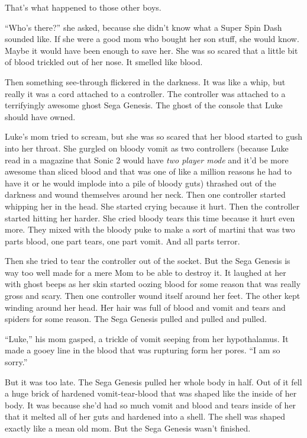 That's what happened to those other boys.



``Who's there?'' she asked, because she
didn't know what a Super Spin Dash sounded like. If she were
a good mom who bought her son stuff, she would know. Maybe it would
have been enough to save her. She was so scared that a little bit
of blood trickled out of her nose. It smelled like blood.



Then something see-through flickered in the darkness. It was like a
whip, but really it was a cord attached to a controller. The
controller was attached to a terrifyingly awesome ghost Sega
Genesis. The ghost of the console that Luke should have
owned.



Luke's mom tried to scream, but she was so scared that her
blood started to gush into her throat. She gurgled on bloody vomit
as two controllers (because Luke read in a magazine that Sonic 2
would have {\em two player mode} and it'd be more awesome
than sliced blood and that was one of like a million reasons he had
to have it or he would implode into a pile of bloody guts) thrashed
out of the darkness and wound themselves around her neck. Then one
controller started whipping her in the head. She started crying
because it hurt. Then the controller started hitting her harder.
She cried bloody tears this time because it hurt even more. They
mixed with the bloody puke to make a sort of martini that was two
parts blood, one part tears, one part vomit. And all parts
terror.



Then she tried to tear the controller out of the socket. But the
Sega Genesis is way too well made for a mere Mom to be able to
destroy it. It laughed at her with ghost beeps as her skin started
oozing blood for some reason that was really gross and scary. Then
one controller wound itself around her feet. The other kept winding
around her head. Her hair was full of blood and vomit and tears and
spiders for some reason. The Sega Genesis pulled and pulled and
pulled.



``Luke,'' his mom gasped, a trickle of vomit seeping from
her hypothalamus. It made a gooey line in the blood that was
rupturing form her pores. ``I am so sorry.''



But it was too late. The Sega Genesis pulled her whole body in
half. Out of it fell a huge brick of hardened vomit-tear-blood that
was shaped like the inside of her body. It was because she'd
had so much vomit and blood and tears inside of her that it melted
all of her guts and hardened into a shell. The shell was shaped
exactly like a mean old mom. But the Sega Genesis wasn't
finished.




